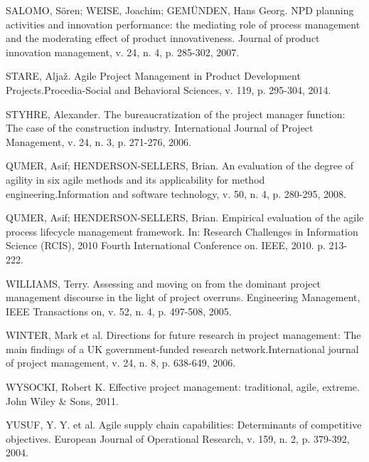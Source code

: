 SALOMO, Sören; WEISE, Joachim; GEMÜNDEN, Hans Georg. NPD planning activities and innovation performance: the mediating role of process management and the moderating effect of product innovativeness. Journal of product innovation management, v. 24, n. 4, p. 285-302, 2007.

STARE, Aljaž. Agile Project Management in Product Development Projects.Procedia-Social and Behavioral Sciences, v. 119, p. 295-304, 2014.

STYHRE, Alexander. The bureaucratization of the project manager function: The case of the construction industry. International Journal of Project Management, v. 24, n. 3, p. 271-276, 2006.

QUMER, Asif; HENDERSON-SELLERS, Brian. An evaluation of the degree of agility in six agile methods and its applicability for method engineering.Information and software technology, v. 50, n. 4, p. 280-295, 2008.

QUMER, Asif; HENDERSON-SELLERS, Brian. Empirical evaluation of the agile process lifecycle management framework. In: Research Challenges in Information Science (RCIS), 2010 Fourth International Conference on. IEEE, 2010. p. 213-222.

WILLIAMS, Terry. Assessing and moving on from the dominant project management discourse in the light of project overruns. Engineering Management, IEEE Transactions on, v. 52, n. 4, p. 497-508, 2005.

WINTER, Mark et al. Directions for future research in project management: The main findings of a UK government-funded research network.International journal of project management, v. 24, n. 8, p. 638-649, 2006.

WYSOCKI, Robert K. Effective project management: traditional, agile, extreme. John Wiley \& Sons, 2011.

YUSUF, Y. Y. et al. Agile supply chain capabilities: Determinants of competitive objectives. European Journal of Operational Research, v. 159, n. 2, p. 379-392, 2004.
